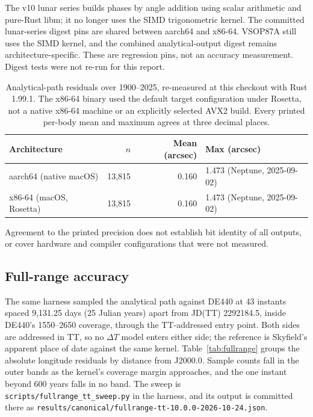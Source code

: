 \documentclass[11pt]{article}
\begin{document}
The v10 lunar series builds phases by angle addition using scalar arithmetic and
pure-Rust libm; it no longer uses the SIMD trigonometric kernel.
The committed lunar-series digest pins are shared between aarch64 and x86-64.
VSOP87A still uses the SIMD kernel, and the combined analytical-output digest
remains architecture-specific. These are regression pins, not an accuracy measurement.
Digest tests were not re-run for this report.

\begin{table}[!htbp]
\centering
\small
\begin{tabular}{@{}lrrl@{}}
\toprule
Architecture & $n$ & Mean (arcsec) & Max (arcsec) \\
\midrule
aarch64 (native macOS) & 13,815 & 0.160 & 1.473 (Neptune, 2025-09-02) \\
x86-64 (macOS, Rosetta) & 13,815 & 0.160 & 1.473 (Neptune, 2025-09-02) \\
\bottomrule
\end{tabular}
\caption{Analytical-path residuals over 1900--2025, re-measured at this checkout
with Rust 1.99.1. The x86-64 binary used the default target configuration under
Rosetta, not a native x86-64 machine or an explicitly selected AVX2 build.
Every printed per-body mean and maximum agrees at three decimal places.}
\label{tab:arch}
\end{table}

Agreement to the printed precision does not establish bit identity of all outputs,
or cover hardware and compiler configurations that were not measured.

\subsection{Full-range accuracy}
\label{sec:fullrange}

The same harness sampled the analytical path against DE440 at 43 instants spaced
9,131.25 days (25 Julian years) apart from JD(TT) 2292184.5, inside DE440's 1550--2650
coverage, through the TT-addressed entry point. Both sides are addressed in TT, so no
$\Delta T$ model enters either side; the reference is Skyfield's apparent place of date
against the same kernel. Table~\ref{tab:fullrange} groups the absolute longitude residuals
by distance from J2000.0. Sample counts fall in the outer bands as the kernel's coverage
margin approaches, and the one instant beyond 600 years falls in no band. The sweep is
\texttt{scripts/fullrange\_tt\_sweep.py} in the harness, and its output is committed there
as \texttt{results/canonical/fullrange-tt-10.0.0-2026-10-24.json}.
\end{document}
